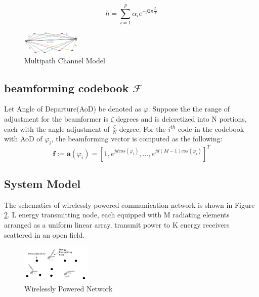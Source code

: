 \documentclass[journal]{IEEEtran}
\begin{document}
\begin{multicols}{2}
\begin{equation}
h=\sum_{i=1}^p \alpha_i e^{-j2\pi \frac{d_i}{\lambda}}
\end{equation}

\begin{figure}[H]
\centering
\includegraphics[width=0.25\textwidth]{channel.png}
\caption{Multipath Channel Model}
\label{fig:channel}
\end{figure}
\end{multicols}


\subsection{beamforming codebook $\mathcal{F}$}

Let Angle of Departure(AoD) be denoted as $\varphi$. Suppose the the range of adjustment for the beamformer is $\zeta$ degrees and is deicretized into N portions, each with the angle adjustment of $\frac{\zeta}{N}$ degree. For the $i^{th}$ code in the codebook with AoD of $\varphi_i$, the beamforming vector is computed as the following:
\begin{equation}
\textbf{f} := \textbf{a}(\varphi_i)= [1,e^{jdcos(\varphi_i)},...,e^{jd(M-1)cos(\varphi_i)}]^T
\end{equation}

\subsection{System Model}

The schematics of wirelessly powered communication network is shown in Figure \ref{fig:MIMO}. L energy transmitting node, each equipped with M radiating elements arranged as a uniform linear array, transmit power to K energy receivers scattered in an open field.

\begin{figure}[H]
    \centering
    \includegraphics[width=0.3\textwidth]{6.png}
    \caption{Wirelessly Powered Network}
    \label{fig:MIMO}
\end{figure}
\end{document}
